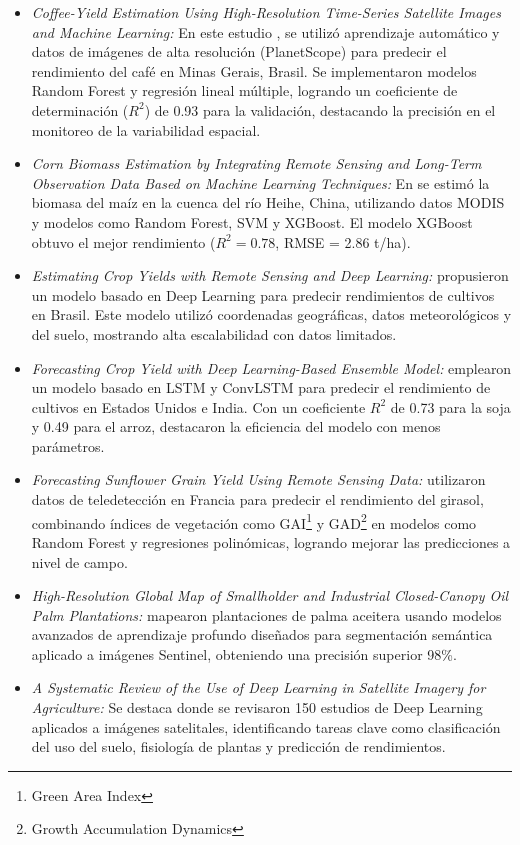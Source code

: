 \begin{itemize}

    \item \textit{Coffee-Yield Estimation Using High-Resolution Time-Series Satellite Images and Machine Learning:} En este estudio \cite{martello2022}, se utilizó aprendizaje automático y datos de imágenes de alta resolución (PlanetScope) para predecir el rendimiento del café en Minas Gerais, Brasil. Se implementaron modelos Random Forest y regresión lineal múltiple, logrando un coeficiente de determinación ($R^2$) de 0.93 para la validación, destacando la precisión en el monitoreo de la variabilidad espacial.

    \item \textit{Corn Biomass Estimation by Integrating Remote Sensing and Long-Term Observation Data Based on Machine Learning Techniques:} En \cite{geng2021} se estimó la biomasa del maíz en la cuenca del río Heihe, China, utilizando datos MODIS y modelos como Random Forest, SVM y XGBoost. El modelo XGBoost obtuvo el mejor rendimiento ($R^2 = 0.78$, RMSE = 2.86 t/ha).

    \item \textit{Estimating Crop Yields with Remote Sensing and Deep Learning:} \cite{cunha2020} propusieron un modelo basado en Deep Learning para predecir rendimientos de cultivos en Brasil. Este modelo utilizó coordenadas geográficas, datos meteorológicos y del suelo, mostrando alta escalabilidad con datos limitados.

    \item \textit{Forecasting Crop Yield with Deep Learning-Based Ensemble Model:} \cite{divakar2022} emplearon un modelo basado en LSTM y ConvLSTM para predecir el rendimiento de cultivos en Estados Unidos e India. Con un coeficiente $R^2$ de 0.73 para la soja y 0.49 para el arroz, destacaron la eficiencia del modelo con menos parámetros.

    \item \textit{Forecasting Sunflower Grain Yield Using Remote Sensing Data:} \cite{debaeke2023} utilizaron datos de teledetección en Francia para predecir el rendimiento del girasol, combinando índices de vegetación como GAI\footnote{Green Area Index} y GAD\footnote{Growth Accumulation Dynamics} en modelos como Random Forest y regresiones polinómicas, logrando mejorar las predicciones a nivel de campo.

    \item \textit{High-Resolution Global Map of Smallholder and Industrial Closed-Canopy Oil Palm Plantations:} \cite{descals2021} mapearon plantaciones de palma aceitera usando modelos avanzados de aprendizaje profundo diseñados para segmentación semántica aplicado a imágenes Sentinel, obteniendo una precisión superior 98\%.

    \item \textit{A Systematic Review of the Use of Deep Learning in Satellite Imagery for Agriculture:} Se destaca \cite{victor2022} donde se revisaron 150 estudios de Deep Learning aplicados a imágenes satelitales, identificando tareas clave como clasificación del uso del suelo, fisiología de plantas y predicción de rendimientos.

\end{itemize}

